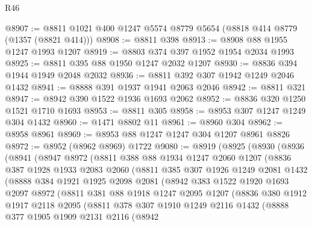 \begin{lexlean}{R46}
\begin{coremodule}
@8907 := @8811 @1021 @400 @1247 @5574 @8779 @5654 (@8818 @414 @8779 (@1357 (@8821 @414)))
@8908 := @8811 @398
@8913 := @8908 @88 @1955 @1247 @1993 @1207
@8919 := @8803 @374 @397 @1952 @1954 @2034 @1993
@8925 := @8811 @395 @88 @1950 @1247 @2032 @1207
@8930 := @8836 @394 @1944 @1949 @2048 @2032
@8936 := @8811 @392 @307 @1942 @1249 @2046 @1432
@8941 := @8888 @391 @1937 @1941 @2063 @2046
@8942 := @8811 @321
@8947 := @8942 @390 @1522 @1936 @1693 @2062
@8952 := @8836 @320 @1250 @1521 @1710 @1693
@8953 := @8811 @305
@8958 := @8953 @307 @1247 @1249 @304 @1432
@8960 := @1471 @8802 @11
@8961 := @8960 @304
@8962 := @8958 @8961
@8969 := @8953 @88 @1247 @1247 @304 @1207 @8961 @8826
@8972 := @8952 (@8962 @8969) @1722
@9080 := @8919
    (@8925
      (@8930
        (@8936
          (@8941
            (@8947
              @8972
              (@8811
                @388
                @88
                @1934
                @1247
                @2060
                @1207
                (@8836
                  @387
                  @1928
                  @1933
                  @2083
                  @2060
                  (@8811
                    @385
                    @307
                    @1926
                    @1249
                    @2081
                    @1432
                    (@8888
                      @384
                      @1921
                      @1925
                      @2098
                      @2081
                      (@8942
                        @383
                        @1522
                        @1920
                        @1693
                        @2097
                        @8972
                        (@8811
                          @381
                          @88
                          @1918
                          @1247
                          @2095
                          @1207
                          (@8836
                            @380
                            @1912
                            @1917
                            @2118
                            @2095
                            (@8811
                              @378
                              @307
                              @1910
                              @1249
                              @2116
                              @1432
                              (@8888
                                @377
                                @1905
                                @1909
                                @2131
                                @2116
                                (@8942

\end{coremodule}
\end{lexlean}
